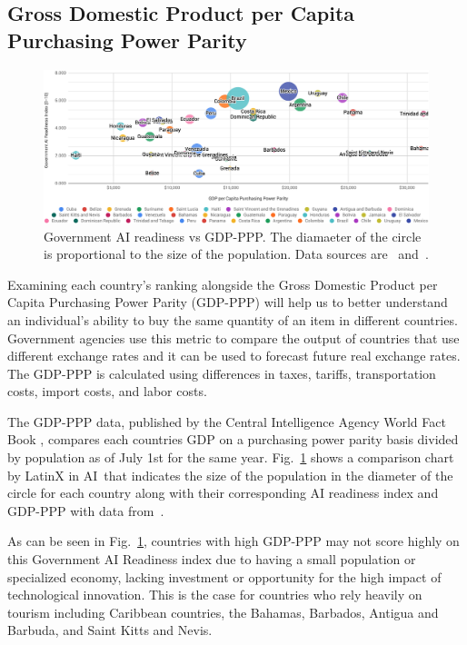 \documentclass[conference]{IEEEtran}
\begin{document}
\subsection{Gross Domestic Product per Capita Purchasing Power Parity}

\begin{figure}[!t]
\centering
\includegraphics[width=\textwidth]{gdp-ppp}
\caption{Government AI readiness vs GDP-PPP. The diamaeter of the circle is proportional to the size of the population. Data sources are~\cite{miller2019government} and~\cite{central2019world}.}
\label{fig:gdp-ppp}
\end{figure}

Examining each country's ranking alongside the Gross Domestic Product per Capita Purchasing Power Parity (GDP-PPP) will help us to better understand an individual's ability to buy the same quantity of an item in different countries. Government agencies use this metric to compare the output of countries that use different exchange rates and it can be used to forecast future real exchange rates. The GDP-PPP is calculated using differences in taxes, tariffs, transportation costs, import costs, and labor costs.

The GDP-PPP data, published by the Central Intelligence Agency World Fact Book \cite{central2019world}, compares each countries GDP on a purchasing power parity basis divided by population as of July 1st for the same year. Fig.~\ref{fig:gdp-ppp} shows a comparison chart by LatinX in AI\texttrademark~that indicates the size of the population in the diameter of the circle for each country along with their corresponding AI readiness index and GDP-PPP with data from~\cite{central2019world,miller2019government}.

As can be seen in  Fig.~\ref{fig:gdp-ppp}, countries with high GDP-PPP may not score highly on this Government AI Readiness index due to having a small population or specialized economy, lacking investment or opportunity for the high impact of technological innovation. This is the case for countries who rely heavily on tourism including Caribbean countries, the Bahamas, Barbados, Antigua and Barbuda, and Saint Kitts and Nevis.
\end{document}
